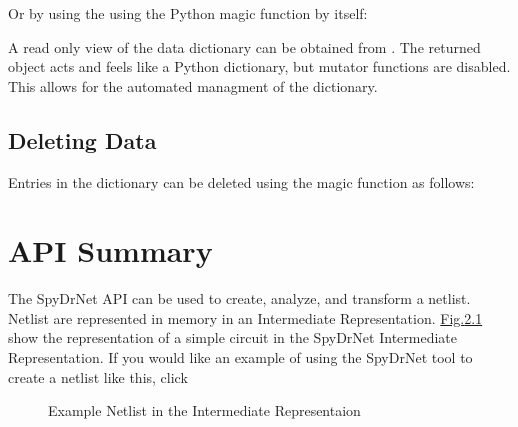 \documentclass[letterpaper,10pt,english,openany,oneside]{sphinxmanual}
\begin{document}
Or by using the using the Python  magic function by itself:

\begin{sphinxVerbatim}[commandchars=\\\{\}]
\PYG{p}{[}\PYG{p}{]}
\end{sphinxVerbatim}

A read only view of the data dictionary can be obtained from . The returned object acts and feels like
a Python dictionary, but mutator functions are disabled. This allows for the automated managment of the dictionary.


\section{Deleting Data}
\label{\detokenize{reference/element_data:deleting-data}}
Entries in the dictionary can be deleted using the  magic function as follows:

\begin{sphinxVerbatim}[commandchars=\\\{\}]
 \PYG{p}{[}\PYG{p}{]}
\end{sphinxVerbatim}


\chapter{API Summary}
\label{\detokenize{reference/classes/index:api-summary}}\label{\detokenize{reference/classes/index:id1}}\label{\detokenize{reference/classes/index::doc}}
The SpyDrNet API can be used to create, analyze, and transform a netlist. Netlist are represented in memory in an Intermediate Representation. \hyperref[\detokenize{reference/classes/index:fig-exampleir}]{Fig.\@ \ref{\detokenize{reference/classes/index:fig-exampleir}}} show the representation of a simple circuit in the SpyDrNet Intermediate Representation.
If you would like an example of using the SpyDrNet tool to create a netlist like this, click 

\begin{figure}[H]
\centering
\capstart

\noindent{}
\caption{Example Netlist in the Intermediate Representaion}\label{\detokenize{reference/classes/index:id2}}\label{\detokenize{reference/classes/index:fig-exampleir}}\end{figure}
\end{document}
